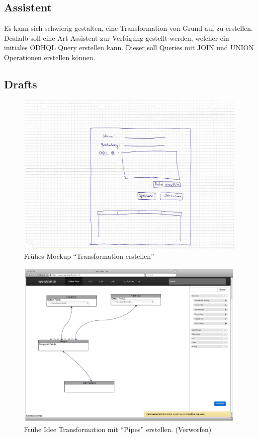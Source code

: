 \subsection{Assistent}
Es kann sich schwierig gestalten, eine Transformation von Grund auf zu erstellen. Deshalb soll eine Art Assistent zur Verfügung gestellt werden, welcher ein initiales ODHQL Query erstellen kann. Dieser soll Queries mit JOIN und UNION Operationen erstellen können.

\subsection{Drafts}
\begin{figure}[H]
    \centering
    \includegraphics[width=0.6\linewidth]{fig/mockup_hcdi}
    \caption{Frühes Mockup ``Transformation erstellen''}
    \label{fig:pd:mockup-upload}
\end{figure}
\begin{figure}[H]
    \centering
    \includegraphics[width=0.8\linewidth]{fig/Wireframes-Connectors}
    \caption{Frühe Idee Transformation mit ``Pipes'' erstellen. (Verworfen)}
    \label{fig:pd:connectors}
\end{figure}
